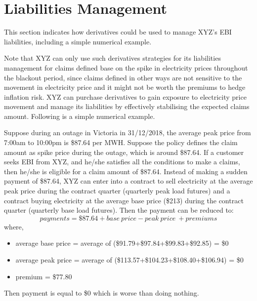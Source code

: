 \documentclass[12pt]{article}
\begin{document}
\section{Liabilities Management}
\begin{flushleft}
This section indicates how derivatives could be used to manage XYZ’s EBI liabilities, including a simple numerical example. \par
Note that XYZ can only use such derivatives strategies for its liabilities management for claims defined base on the spike in electricity prices throughout the blackout period, since claims defined in other ways are not sensitive to the movement in electricity price and it might not be worth the premiums to hedge inflation risk. XYZ can purchase derivatives to gain exposure to electricity price movement and manage its liabilities by effectively stabilising the expected claims amount. Following is a simple numerical example.\par
\end{flushleft}
Suppose during an outage in Victoria in 31/12/2018, the average peak price from 7:00am to 10:00pm is \$87.64 per MWH. Suppose the policy defines the claim amount as spike price during the outage, which is around \$87.64. If a customer seeks EBI from XYZ, and he/she satisfies all the conditions to make a claims, then he/she is eligible for a claim amount of \$87.64. Instead of making a sudden payment of \$87.64, XYZ can enter into a contract to sell electricity at the average peak price during the contract quarter (quarterly peak load futures) and a contract buying electricity at the average base price (\$213) during the contract quarter (quarterly base load futures). Then the payment can be reduced to:
$$ payments = \$87.64 + base\ price - peak\ price\ + premiums $$
where, 
\begin{itemize}
    \item average base price = average of (\$91.79+\$97.84+\$99.83+\$92.85) = \$0 \parencite{data1}
    \item average peak price = average of (\$113.57+\$104.23+\$108.40+\$106.94) = \$0 \parencite{data1}
    \item premium = \$77.80 \parencite{data2}
\end{itemize}
Then payment is equal to \$0 which is worse than doing nothing.
\frameboxend
\newpage

\end{document}
